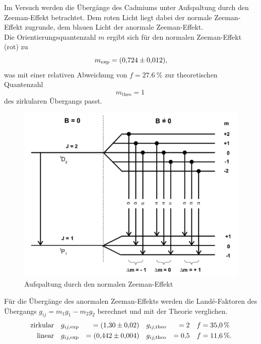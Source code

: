 Im Versuch werden die Übergänge des Cadmiums unter Aufspaltung durch den Zeeman-Effekt betrachtet.
Dem roten Licht liegt dabei der normale Zeeman-Effekt zugrunde, dem blauen Licht der anormale Zeeman-Effekt.\\
Die Orientierungsquantenzahl $m$ ergibt sich für den normalen Zeeman-Effekt (rot) zu
\begin{equation*}
  m_{\text{exp}} = \SI{0.724 \pm 0.012}{},
\end{equation*}
was mit einer relativen Abweichung von $f=\SI{27.6}{\%}$ zur theoretischen Quantenzahl
\begin{equation*}
  m_{\text{theo}} = \SI{1}{}
\end{equation*}
des zirkularen Übergangs passt.
\begin{figure}[h!]
  \centering
  \includegraphics[width=\textwidth]{normal.png}
  \caption{Aufspaltung durch den normalen Zeeman-Effekt \cite{1}}
  \label{fig:normal}
\end{figure}
\FloatBarrier
Für die Übergänge des anormalen Zeeman-Effekts werden die Landé-Faktoren des Übergangs $g_{ij}=m_{1}g_{1}-m_{2}g_{2}$ berechnet und mit der Theorie verglichen.
\begin{align*}
  \text{zirkular}  &&& g_{ij, \text{exp}} &= \SI{1.30 \pm 0.02}{}    &&&   g_{ij, \text{theo}} &= \SI{2}{}     &&&  f=\SI{35.0}{\%}   \\
  \text{linear}    &&& g_{ij, \text{exp}} &= \SI{0.442 \pm 0.004}{}  &&&   g_{ij, \text{theo}} &= \SI{0.5}{}   &&&  f=\SI{11.6}{\%}   .
\end{align*}
